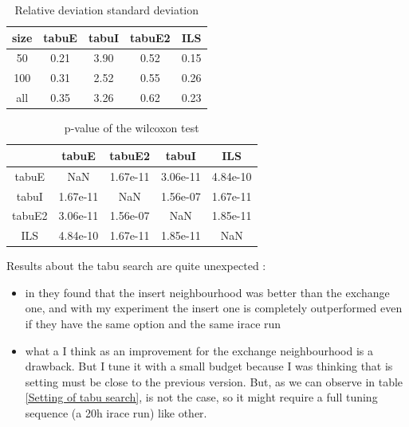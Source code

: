 \documentclass[12pt,a4paper]{article}
\begin{document}
\begin{table}[!h]
\centering
\begin{tabular}{|*{5}{c|}}
  \hline
  size & tabuE & tabuI & tabuE2 & ILS\\
  \hline
  50 & 0.21 & 3.90 & 0.52 & 0.15 \\ 
  100 & 0.31 & 2.52 & 0.55 & 0.26 \\
  all & 0.35 & 3.26 & 0.62 & 0.23 \\
  \hline
\end{tabular}
\caption{Relative deviation standard deviation}
\label{Relative deviation standard deviation}
\end{table}

\begin{table}[!h]
\centering
\begin{tabular}{|*{5}{c|}}
  \hline
  ~ & tabuE & tabuE2 & tabuI & ILS\\
  \hline
tabuE & NaN & 1.67e-11 & 3.06e-11 & 4.84e-10 \\
tabuI & 1.67e-11 & NaN & 1.56e-07 & 1.67e-11 \\
tabuE2 & 3.06e-11 & 1.56e-07 & NaN & 1.85e-11 \\
ILS & 4.84e-10 & 1.67e-11 & 1.85e-11 & NaN \\
  \hline
\end{tabular}
\caption{p-value of the wilcoxon test}
\label{p-value of the wilcoxon test}
\end{table}

Results about the tabu search are quite unexpected :
\begin{itemize}
\item
in \cite{Tseng2010121} they found that the insert neighbourhood was better than the exchange one, and with my experiment the insert one is completely outperformed even if they have the same option and the same irace run
\item
what a I think as an improvement for the exchange neighbourhood is a drawback. But I tune it with a small budget because I was thinking that is setting must be close to the previous version. But, as we can observe in table \ref{Setting of tabu search}, is not the case, so it might require a full tuning sequence (a 20h irace run) like other.
\end{itemize}
\end{document}
